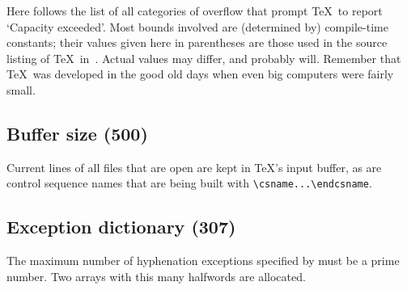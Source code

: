Here follows the list of all categories of overflow that
prompt \TeX\ to report `Capacity exceeded'.
Most bounds involved are (determined by) compile-time
constants; their values given here in parentheses are those
used in the source listing of \TeX\ in~\cite{Knuth:TeXbook}.
Actual values may differ, and probably will. Remember
that \TeX\ was developed in the good old days when even
big computers were fairly small.

\subsection{Buffer size {\rm(500)}}

Current lines of all files that are open are kept in
\TeX's input buffer, as are control sequence names
that are being built with \verb-\csname...\endcsname-.

\subsection{Exception dictionary {\rm(307)}}

The maximum number of hyphenation exceptions specified
by  must be a prime number.
Two arrays with this many halfwords are allocated.

